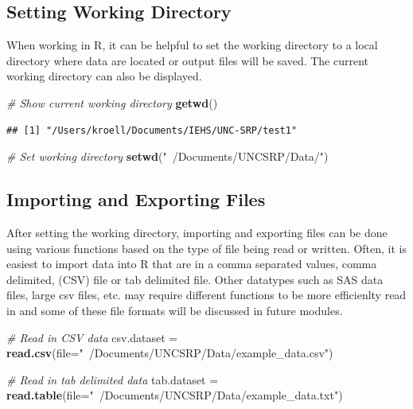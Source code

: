 \documentclass[
]{book}
\newenvironment{Shaded}{\begin{snugshade}}{\end{snugshade}}
\newcommand{\CommentTok}[1]{\textcolor[rgb]{0.56,0.35,0.01}{\textit{#1}}}
\newcommand{\DataTypeTok}[1]{\textcolor[rgb]{0.13,0.29,0.53}{#1}}
\newcommand{\KeywordTok}[1]{\textcolor[rgb]{0.13,0.29,0.53}{\textbf{#1}}}
\newcommand{\NormalTok}[1]{#1}
\newcommand{\StringTok}[1]{\textcolor[rgb]{0.31,0.60,0.02}{#1}}
\begin{document}
\hypertarget{setting-working-directory}{%
\subsection{Setting Working Directory}\label{setting-working-directory}}

When working in R, it can be helpful to set the working directory to a local directory where data are located or output files will be saved. The current working directory can also be displayed.

\begin{Shaded}
\begin{Highlighting}[]
\CommentTok{# Show current working directory}
\KeywordTok{getwd}\NormalTok{()}
\end{Highlighting}
\end{Shaded}

\begin{verbatim}
## [1] "/Users/kroell/Documents/IEHS/UNC-SRP/test1"
\end{verbatim}

\begin{Shaded}
\begin{Highlighting}[]
\CommentTok{# Set working directory}
\KeywordTok{setwd}\NormalTok{(}\StringTok{"~/Documents/UNCSRP/Data/"}\NormalTok{)}
\end{Highlighting}
\end{Shaded}

\hypertarget{importing-and-exporting-files}{%
\subsection{Importing and Exporting Files}\label{importing-and-exporting-files}}

After setting the working directory, importing and exporting files can be done using various functions based on the type of file being read or written. Often, it is easiest to import data into R that are in a comma separated values, comma delimited, (CSV) file or tab delimited file. Other datatypes such as SAS data files, large csv files, etc. may require different functions to be more efficienlty read in and some of these file formats will be discussed in future modules.

\begin{Shaded}
\begin{Highlighting}[]
\CommentTok{# Read in CSV data}
\NormalTok{csv.dataset =}\StringTok{ }\KeywordTok{read.csv}\NormalTok{(}\DataTypeTok{file=}\StringTok{"~/Documents/UNCSRP/Data/example_data.csv"}\NormalTok{)}

\CommentTok{# Read in tab delimited data}
\NormalTok{tab.dataset =}\StringTok{ }\KeywordTok{read.table}\NormalTok{(}\DataTypeTok{file=}\StringTok{"~/Documents/UNCSRP/Data/example_data.txt"}\NormalTok{)}
\end{Highlighting}
\end{Shaded}
\end{document}
